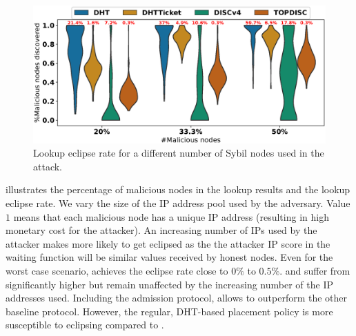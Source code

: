 %

\begin{figure}[!h]
\includegraphics[width=\linewidth]{results/security/violin_percentEvil_percentageMaliciousDiscovered_t10.eps}
\caption{Lookup eclipse rate for a different number of Sybil nodes used in the attack.}
\label{fig:eclipse_evil}
\end{figure}

 illustrates the percentage of malicious nodes in the lookup results and the lookup eclipse rate. We vary the size of the IP address pool used by the adversary. Value $1$ means that each malicious node has a unique IP address (resulting in high monetary cost for the attacker). An increasing number of IPs used by the attacker makes \sysname more likely to get eclipsed as the the attacker IP score in the waiting function will be similar values received by honest nodes.
Even for the worst case scenario, \sysname achieves the eclipse rate close to $0\%$ to $0.5\%$.
\altname and \discv suffer from significantly higher but remain unaffected by the increasing number of the IP addresses used. Including the admission protocol, allows \altnameticket to outperform the other baseline protocol. However, the regular, DHT-based placement policy is more susceptible to eclipsing compared to \sysname.

